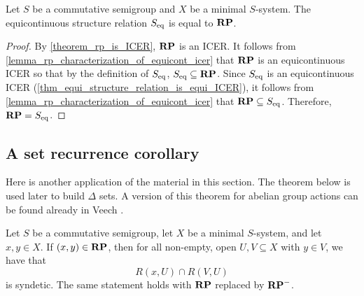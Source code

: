 \begin{theorem}
\label{thm_rp_equals_s}
\leanok{}
    Let $S$ be a commutative semigroup and $X$ be a minimal $S$-system.  The equicontinuous structure relation $S_\text{eq}$ is equal to $\mathbf{RP}$.
\end{theorem}

\begin{proof}
\leanok{}
    By \cref{theorem_rp_is_ICER}, $\mathbf{RP}$ is an ICER.  It follows from \cref{lemma_rp_characterization_of_equicont_icer} that $\mathbf{RP}$ is an equicontinuous ICER so that by the definition of $S_\text{eq}$, $S_\text{eq} \subseteq \mathbf{RP}$.  Since $S_\text{eq}$ is an equicontinuous ICER (\cref{thm_equi_structure_relation_is_equi_ICER}), it follows from \cref{lemma_rp_characterization_of_equicont_icer} that $\mathbf{RP} \subseteq S_\text{eq}$.  Therefore, $\mathbf{RP} = S_\text{eq}$.
\end{proof}

\subsection{A set recurrence corollary}

Here is another application of the material in this section. The theorem below is used later to build $\Delta$ sets.  A version of this theorem for abelian group actions can be found already in Veech \cite{veech_1968}.

\begin{theorem}
\label{thm_delta_set_builder_prestep}
\leanok{}
    Let $S$ be a commutative semigroup, let $X$ be a minimal $S$-system, and let $x, y \in X$.  If $(x,y) \in \mathbf{RP}$, then for all non-empty, open $U, V \subseteq X$ with $y \in V$, we have that
    \[R(x,U) \cap R(V,U)\]
    is syndetic. The same statement holds with $\mathbf{RP}$ replaced by $\mathbf{RP}^-$.
\end{theorem}

